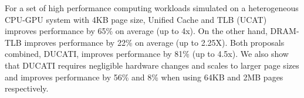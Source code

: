 \noindent For a set of high performance computing workloads simulated
on a heterogeneous CPU-GPU system with 4KB page size, Unified Cache
and TLB (UCAT) improves performance by 65\% on average (up to 4x). On
the other hand, DRAM-TLB improves performance by 22\% on average (up
to 2.25X). Both proposals combined, DUCATI, improves performance by
81\% (up to 4.5x). We also show that DUCATI requires negligible
hardware changes and scales to larger page sizes and improves
performance by 56\% and 8\% when using 64KB and 2MB pages
respectively.









